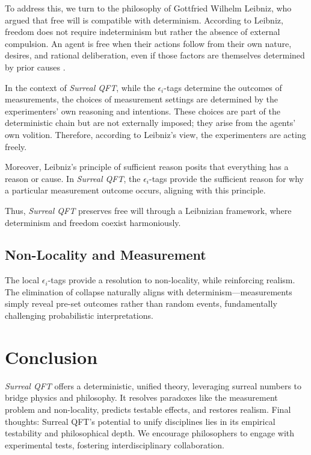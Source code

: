 \documentclass{article}
\begin{document}
To address this, we turn to the philosophy of Gottfried Wilhelm Leibniz, who argued that free will is compatible with determinism. According to Leibniz, freedom does not require indeterminism but rather the absence of external compulsion. An agent is free when their actions follow from their own nature, desires, and rational deliberation, even if those factors are themselves determined by prior causes \cite{Leibniz1686}.

In the context of \textit{Surreal QFT}, while the \(\epsilon_i\)-tags determine the outcomes of measurements, the choices of measurement settings are determined by the experimenters' own reasoning and intentions. These choices are part of the deterministic chain but are not externally imposed; they arise from the agents' own volition. Therefore, according to Leibniz's view, the experimenters are acting freely.

Moreover, Leibniz's principle of sufficient reason posits that everything has a reason or cause. In \textit{Surreal QFT}, the \(\epsilon_i\)-tags provide the sufficient reason for why a particular measurement outcome occurs, aligning with this principle.

Thus, \textit{Surreal QFT} preserves free will through a Leibnizian framework, where determinism and freedom coexist harmoniously.

\subsection{Non-Locality and Measurement}
The local \(\epsilon_i\)-tags provide a resolution to non-locality,
while reinforcing realism. The elimination of collapse
naturally aligns with determinism---measurements simply reveal
pre-set outcomes rather than random events,
fundamentally challenging probabilistic interpretations.

\section{Conclusion}
\textit{Surreal QFT} offers a deterministic, unified theory, leveraging surreal numbers to bridge physics and philosophy. It resolves paradoxes like the measurement problem and non-locality, predicts testable effects, and restores realism. Final thoughts: Surreal QFT's potential to unify disciplines lies in its empirical testability and philosophical depth. We encourage philosophers to engage with experimental tests, fostering interdisciplinary collaboration.
\end{document}
